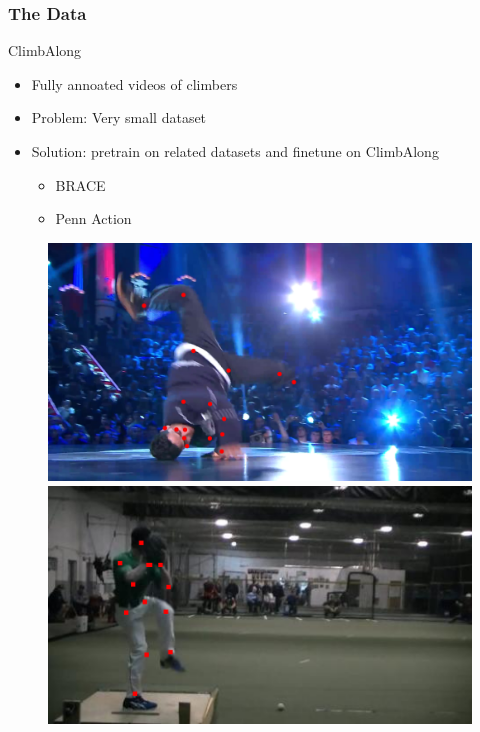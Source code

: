 \documentclass{beamer}
\begin{document}
\begin{frame}
\begin{minipage}{0.45\textwidth}
\begin{figure}
        \end{figure}
    \end{minipage}
\end{frame}

\begin{frame}
    \frametitle{The Data}
    \begin{minipage}{0.5\textwidth}
        ClimbAlong
        \begin{itemize}
            \item Fully annoated videos of climbers
            \item Problem: Very small dataset
            \item Solution: pretrain on related datasets and finetune on ClimbAlong
            \begin{itemize}
                \item BRACE
                \item Penn Action
            \end{itemize}
        \end{itemize}
    \end{minipage} \hfill
    \begin{minipage}{0.45\textwidth}
        \begin{figure}
            \center
            \includegraphics[width = \textwidth]{../report/entities/BRACE_1152.png}
            \includegraphics[width = \textwidth]{../report/entities/PA_64.png}
        \end{figure}
    \end{minipage}
\end{frame}
\end{document}
